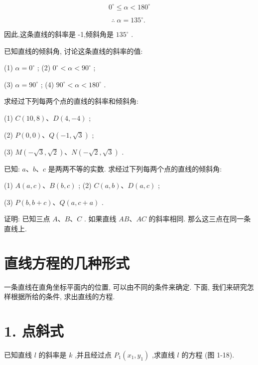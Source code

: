 \documentclass[lang=cn,newtx,10pt,scheme=chinese]{elegantbook}
\begin{document}
\[
    {0}^{ \circ } \leq \alpha < {180}^{ \circ }
\]

\[
  \therefore \;\alpha = {135}^{ \circ }\text{. }
\]

因此,这条直线的斜率是 -1,倾斜角是 \({135}^{ \circ }\) .

\begin{problemset}[练习]

\item 已知直线的倾斜角, 讨论这条直线的斜率的值:

(1) \(\alpha = {0}^{ \circ }\) ; (2) \({0}^{ \circ } < \alpha < {90}^{ \circ }\) ;

(3) \(\alpha = {90}^{ \circ }\) ; (4) \({90}^{ \circ } < \alpha < {180}^{ \circ }\) .

\item 求经过下列每两个点的直线的斜率和倾斜角:

(1) \(C\left( {{10},8}\right) \text{、}D\left( {4, - 4}\right)\) ;

(2) \(P\left( {0,0}\right) \text{、}Q\left( {-1,\sqrt{3}}\right)\) ;

(3) \(M\left( {-\sqrt{3},\sqrt{2}}\right) \text{、}N\left( {-\sqrt{2},\sqrt{3}}\right)\) .

\item 已知: \(a\text{、}b\text{、}c\) 是两两不等的实数. 求经过下列每两个点的直线的倾斜角:

(1) \(A\left( {a,c}\right) \text{、}B\left( {b,c}\right)\) ; (2) \(C\left( {a,b}\right) \text{、}D\left( {a,c}\right)\) ;

(3) \(P\left( {b,b + c}\right) \text{、}Q\left( {a,c + a}\right)\) .

\item 证明: 已知三点 \(A\text{、}B\text{、}C\) . 如果直线 \({AB}\text{、}{AC}\) 的斜率相同. 那么这三点在同一条直线上.
\end{problemset}

\section{直线方程的几种形式}

一条直线在直角坐标平面内的位置, 可以由不同的条件来确定. 下面, 我们来研究怎样根据所给的条件, 求出直线的方程.

\section*{1. 点斜式}

已知直线 \(l\) 的斜率是 \(k\) ,并且经过点 \({P}_{1}\left( {{x}_{1},{y}_{1}}\right)\) ,求直线 \(l\) 的方程 (图 1-18).
\end{document}
